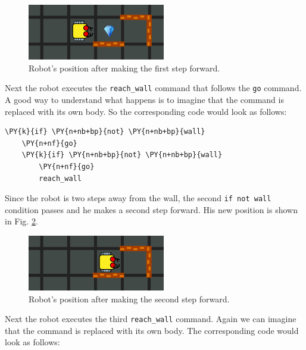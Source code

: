 \begin{figure}[!ht]
\begin{center}
\includegraphics[width=6cm]{img/rec-2.png}
\end{center}
\vspace{-4mm}
\caption{Robot's position after making the first step forward.}
\label{fig:rec2}
\vspace{-4mm}
\end{figure}
\noindent
Next the robot executes the {\tt reach\_wall} command that follows the {\tt go} command. A good way to 
understand what happens is to imagine that the command is replaced with its own body. So the corresponding 
code would look as follows:\\

\begin{bbox}
\begin{Verbatim}[commandchars=\\\{\}]
\PY{k}{if} \PY{n+nb+bp}{not} \PY{n+nb+bp}{wall}
    \PY{n+nf}{go}
    \PY{k}{if} \PY{n+nb+bp}{not} \PY{n+nb+bp}{wall}
        \PY{n+nf}{go}
        reach_wall
\end{Verbatim}
\end{bbox}
\vspace{6mm}

\noindent
Since the robot is two steps away from the wall, the second {\tt if not wall} condition passes and 
he makes a second step forward. His new position is shown in Fig. \ref{fig:rec3}.

\begin{figure}[!ht]
\begin{center}
\includegraphics[width=6cm]{img/rec-3.png}
\end{center}
\vspace{-4mm}
\caption{Robot's position after making the second step forward.}
\label{fig:rec3}
\vspace{-4mm}
\end{figure}
\noindent
Next the robot executes the third {\tt reach\_wall} command. Again we can imagine that the command 
is replaced with its own body. The corresponding code would look as follows:\\

